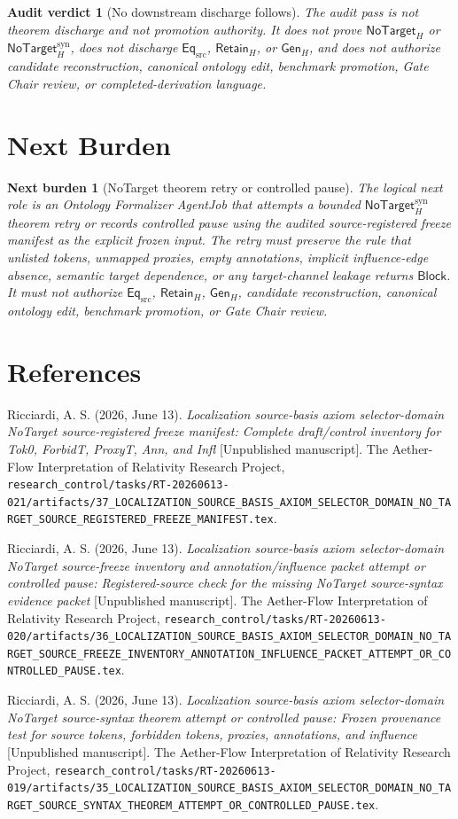 \documentclass[11pt]{article}
\newcommand{\GenH}{\mathsf{Gen}_{H}}
\newcommand{\EqSrc}{\mathsf{Eq}_{\mathrm{src}}}
\newcommand{\RetainH}{\mathsf{Retain}_{H}}
\newcommand{\NoTargetH}{\mathsf{NoTarget}_{H}}
\newcommand{\NoTargetSyn}{\mathsf{NoTarget}_{H}^{\mathrm{syn}}}
\newcommand{\Block}{\mathsf{Block}}
\newtheorem{auditverdict}{Audit verdict}
\newtheorem{nextburden}{Next burden}
\begin{document}
\begin{auditverdict}[No downstream discharge follows]
The audit pass is not theorem discharge and not promotion authority. It
does not prove \(\NoTargetH\) or \(\NoTargetSyn\), does not discharge
\(\EqSrc\), \(\RetainH\), or \(\GenH\), and does not authorize candidate
reconstruction, canonical ontology edit, benchmark promotion, Gate Chair
review, or completed-derivation language.
\end{auditverdict}

\section{Next Burden}

\begin{nextburden}[NoTarget theorem retry or controlled pause]
The logical next role is an Ontology Formalizer AgentJob that attempts a
bounded \(\NoTargetSyn\) theorem retry or records controlled pause using
the audited source-registered freeze manifest as the explicit frozen input.
The retry must preserve the rule that unlisted tokens, unmapped proxies,
empty annotations, implicit influence-edge absence, semantic target
dependence, or any target-channel leakage returns \(\Block\). It must not
authorize \(\EqSrc\), \(\RetainH\), \(\GenH\), candidate reconstruction,
canonical ontology edit, benchmark promotion, or Gate Chair review.
\end{nextburden}

\section*{References}

Ricciardi, A. S. (2026, June 13). \emph{Localization source-basis axiom
selector-domain NoTarget source-registered freeze manifest: Complete
draft/control inventory for Tok0, ForbidT, ProxyT, Ann, and Infl}
[Unpublished manuscript]. The Aether-Flow Interpretation of Relativity
Research Project,
\texttt{research\_control/tasks/RT-20260613-021/artifacts/37\_LOCALIZATION\_SOURCE\_BASIS\_AXIOM\_SELECTOR\_DOMAIN\_NO\_TARGET\_SOURCE\_REGISTERED\_FREEZE\_MANIFEST.tex}.

Ricciardi, A. S. (2026, June 13). \emph{Localization source-basis axiom
selector-domain NoTarget source-freeze inventory and annotation/influence
packet attempt or controlled pause: Registered-source check for the missing
NoTarget source-syntax evidence packet} [Unpublished manuscript]. The
Aether-Flow Interpretation of Relativity Research Project,
\texttt{research\_control/tasks/RT-20260613-020/artifacts/36\_LOCALIZATION\_SOURCE\_BASIS\_AXIOM\_SELECTOR\_DOMAIN\_NO\_TARGET\_SOURCE\_FREEZE\_INVENTORY\_ANNOTATION\_INFLUENCE\_PACKET\_ATTEMPT\_OR\_CONTROLLED\_PAUSE.tex}.

Ricciardi, A. S. (2026, June 13). \emph{Localization source-basis axiom
selector-domain NoTarget source-syntax theorem attempt or controlled pause:
Frozen provenance test for source tokens, forbidden tokens, proxies,
annotations, and influence} [Unpublished manuscript]. The Aether-Flow
Interpretation of Relativity Research Project,
\texttt{research\_control/tasks/RT-20260613-019/artifacts/35\_LOCALIZATION\_SOURCE\_BASIS\_AXIOM\_SELECTOR\_DOMAIN\_NO\_TARGET\_SOURCE\_SYNTAX\_THEOREM\_ATTEMPT\_OR\_CONTROLLED\_PAUSE.tex}.
\end{document}
